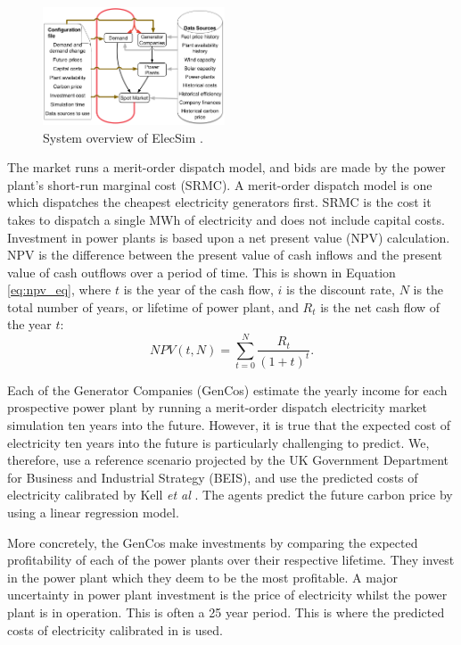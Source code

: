 \documentclass[final,3p,times,twocolumn,numbers]{elsarticle}
\begin{document}
\begin{figure}
    \includegraphics[width=0.48\textwidth,natwidth=610,natheight=400]{figures/methods/System_overview_large.png}
    \caption{System overview of ElecSim \cite{Kell}.}
    \label{fig:model_details}
\end{figure}


The market runs a merit-order dispatch model, and bids are made by the power plant's short-run marginal cost (SRMC). A merit-order dispatch model is one which dispatches the cheapest electricity generators first. SRMC is the cost it takes to dispatch a single MWh of electricity and does not include capital costs. Investment in power plants is based upon a net present value (NPV) calculation. NPV is the difference between the present value of cash inflows and the present value of cash outflows over a period of time. This is shown in Equation \ref{eq:npv_eq}, where $t$ is the year of the cash flow, $i$ is the discount rate, $N$ is the total number of years, or lifetime of power plant, and $R_t$ is the net cash flow of the year $t$:
\begin{equation} \label{eq:npv_eq}
NPV(t, N) = \sum_{t=0}^{N}\frac{R_t}{(1+t)^t}.
\end{equation}

Each of the Generator Companies (GenCos) estimate the yearly income for each prospective power plant by running a merit-order dispatch electricity market simulation ten years into the future. However, it is true that the expected cost of electricity ten years into the future is particularly challenging to predict. We, therefore, use a reference scenario projected by the UK Government Department for Business and Industrial Strategy (BEIS), and use the predicted costs of electricity calibrated by Kell \textit{et al} \cite{Kell2020, DBEIS2019}. The agents predict the future carbon price by using a linear regression model.

More concretely, the GenCos make investments by comparing the expected profitability of each of the power plants over their respective lifetime. They invest in the power plant which they deem to be the most profitable. A major uncertainty in power plant investment is the price of electricity whilst the power plant is in operation. This is often a 25 year period. This is where the predicted costs of electricity calibrated in \cite{Kell2020} is used.
 
\end{document}
